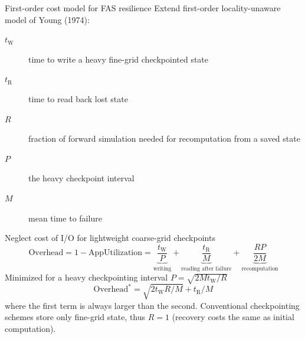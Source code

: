 \documentclass{beamer}
\newcommand{\timeR}{t_{\mathrm{R}}}
\newcommand{\timeW}{t_{\mathrm{W}}}
\begin{document}
\begin{frame}{First-order cost model for FAS resilience}
  Extend first-order locality-unaware model of Young (1974):
  \begin{description}
  \item[$\timeW$] time to write a heavy fine-grid checkpointed state
  \item[$\timeR$] time to read back lost state
  \item[$R$] fraction of forward simulation needed for recomputation from a saved state
  \item[$P$] the heavy checkpoint interval
  \item[$M$] mean time to failure
  \end{description}
  Neglect cost of I/O for lightweight coarse-grid checkpoints
  \begin{equation*}\label{eq:overhead}
    \text{Overhead} = 1 - \text{AppUtilization} = \underbrace{\frac{\timeW}{P}}_{\text{writing}}
    + \underbrace{\frac{\timeR}{M}}_{\text{reading after failure}}
    + \underbrace{\frac{R P}{2M}}_{\text{recomputation}}
  \end{equation*}
  Minimized for a heavy checkpointing interval $P = \sqrt{2 M \timeW / R}$
  \begin{equation*}\label{eq:minoverhead}
    \text{Overhead}^* = \sqrt{2 \timeW R / M} + \timeR / M
  \end{equation*}
  where the first term is always larger than the second.
  Conventional checkpointing schemes store only fine-grid state, thus $R=1$ (recovery costs the same as initial computation).
\end{frame}
\end{document}
